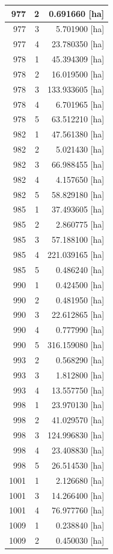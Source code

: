 \documentclass[11pt,]{book}
\begin{document}
\begin{table}
\begin{tabular}[t]{r|r|r}
\hline
977 & 2 & 0.691660 [ha]\\
\hline
977 & 3 & 5.701900 [ha]\\
\hline
977 & 4 & 23.780350 [ha]\\
\hline
978 & 1 & 45.394309 [ha]\\
\hline
978 & 2 & 16.019500 [ha]\\
\hline
978 & 3 & 133.933605 [ha]\\
\hline
978 & 4 & 6.701965 [ha]\\
\hline
978 & 5 & 63.512210 [ha]\\
\hline
982 & 1 & 47.561380 [ha]\\
\hline
982 & 2 & 5.021430 [ha]\\
\hline
982 & 3 & 66.988455 [ha]\\
\hline
982 & 4 & 4.157650 [ha]\\
\hline
982 & 5 & 58.829180 [ha]\\
\hline
985 & 1 & 37.493605 [ha]\\
\hline
985 & 2 & 2.860775 [ha]\\
\hline
985 & 3 & 57.188100 [ha]\\
\hline
985 & 4 & 221.039165 [ha]\\
\hline
985 & 5 & 0.486240 [ha]\\
\hline
990 & 1 & 0.424500 [ha]\\
\hline
990 & 2 & 0.481950 [ha]\\
\hline
990 & 3 & 22.612865 [ha]\\
\hline
990 & 4 & 0.777990 [ha]\\
\hline
990 & 5 & 316.159080 [ha]\\
\hline
993 & 2 & 0.568290 [ha]\\
\hline
993 & 3 & 1.812800 [ha]\\
\hline
993 & 4 & 13.557750 [ha]\\
\hline
998 & 1 & 23.970130 [ha]\\
\hline
998 & 2 & 41.029570 [ha]\\
\hline
998 & 3 & 124.996830 [ha]\\
\hline
998 & 4 & 23.408830 [ha]\\
\hline
998 & 5 & 26.514530 [ha]\\
\hline
1001 & 1 & 2.126680 [ha]\\
\hline
1001 & 3 & 14.266400 [ha]\\
\hline
1001 & 4 & 76.977760 [ha]\\
\hline
1009 & 1 & 0.238840 [ha]\\
\hline
1009 & 2 & 0.450030 [ha]\\

\end{tabular}
\end{table}
\end{document}
